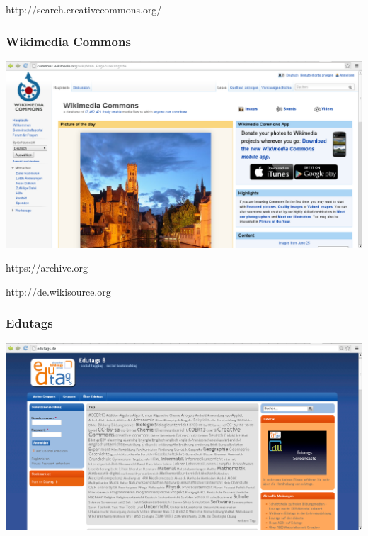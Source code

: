 \documentclass[table]{beamer}
\begin{document}
\begin{frame}
    \begin{center}\Large
      http://search.creativecommons.org/
    \end {center}
\end{frame}

\begin{frame}
  \frametitle{Wikimedia Commons}
  \includegraphics[width=\textwidth]{img/wikicommons.png}
\end{frame}

\begin{frame}
    \begin{center}\Large
      https://archive.org
    \end {center}
\end{frame}

\begin{frame}
    \begin{center}\Large
      http://de.wikisource.org
    \end {center}
\end{frame}

\begin{frame}
  \frametitle{Edutags}
  \includegraphics[width=\textwidth]{img/edutags.png}
\end{frame}
\end{document}
